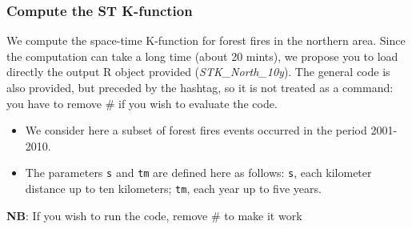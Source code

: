 \documentclass[
]{article}
\newenvironment{Shaded}{\begin{snugshade}}{\end{snugshade}}
\newcommand{\CommentTok}[1]{\textcolor[rgb]{0.56,0.35,0.01}{\textit{#1}}}
\newcommand{\DecValTok}[1]{\textcolor[rgb]{0.00,0.00,0.81}{#1}}
\newcommand{\FunctionTok}[1]{\textcolor[rgb]{0.13,0.29,0.53}{\textbf{#1}}}
\newcommand{\NormalTok}[1]{#1}
\newcommand{\OtherTok}[1]{\textcolor[rgb]{0.56,0.35,0.01}{#1}}
\newcommand{\SpecialCharTok}[1]{\textcolor[rgb]{0.81,0.36,0.00}{\textbf{#1}}}
\providecommand{\tightlist}{%
  \setlength{\itemsep}{0pt}\setlength{\parskip}{0pt}}
\begin{document}
\begin{Shaded}
\end{Shaded}

\subsubsection{Compute the ST K-function}\label{compute-the-st-k-function}

We compute the space-time K-function for forest fires in the northern area.
Since the computation can take a long time (about 20 mints), we propose you to load directly the output R object provided (\emph{STK\_North\_10y}).
The general code is also provided, but preceded by the hashtag, so it is not treated as a command: you have to remove \# if you wish to evaluate the code.

\begin{itemize}
\tightlist
\item
  We consider here a subset of forest fires events occurred in the period 2001-2010.
\item
  The parameters \texttt{s} and \texttt{tm} are defined here as follows: \texttt{s}, each kilometer distance up to ten kilometers; \texttt{tm}, each year up to five years.
\end{itemize}

\textbf{NB}: If you wish to run the code, remove \# to make it work
\end{document}
